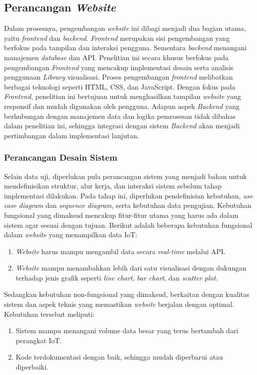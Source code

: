 \subsection{Perancangan \textit{Website}}
Dalam prosesnya, pengembangan \textit{website} ini dibagi menjadi dua bagian utama, yaitu \textit{frontend} dan \textit{backend}. \textit{Frontend} merupakan sisi pengembangan yang berfokus pada tampilan dan interaksi pengguna. Sementara \textit{backend} menangani manajemen \textit{database} dan API. Penelitian ini secara khusus berfokus pada pengembangan \textit{Frontend} yang mencakup implementasi desain serta analisis penggunaan \textit{Library} visualisasi. Proses pengembangan \textit{frontend} melibatkan berbagai teknologi seperti HTML, CSS, dan JavaScript. Dengan fokus pada \textit{Frontend}, penelitian ini bertujuan untuk menghasilkan tampilan \textit{website} yang responsif dan mudah digunakan oleh pengguna. Adapun aspek \textit{Backend} yang berhubungan dengan manajemen data dan logika pemrosesan tidak dibahas dalam penelitian ini, sehingga integrasi dengan sistem \textit{Backend} akan menjadi pertimbangan dalam implementasi lanjutan.

\subsubsection{Perancangan Desain Sistem}
Selain data uji, diperlukan pula perancangan sistem yang menjadi bahan untuk mendefinisikan struktur, alur kerja, dan interaksi sistem sebelum tahap implementasi dilakukan. Pada tahap ini, diperlukan pendefinisian kebutuhan, \textit{use case diagram} dan \textit{sequence diagram}, serta kebutuhan data pengujian. Kebutuhan fungsional yang dimaksud mencakup fitur-fitur utama yang harus ada dalam sistem agar sesuai dengan tujuan. Berikut adalah beberapa kebutuhan fungsional dalam \textit{website} yang menampilkan data IoT:

\begin{enumerate}[label={\arabic*.}]
	\item \textit{Website} harus mampu mengambil data secara \textit{real-time} melalui API.
	\item \textit{Website} mampu menambahkan lebih dari satu visualisasi dengan dukungan terhadap jenis grafik seperti \textit{line chart}, \textit{bar chart}, dan \textit{scatter plot}. 
\end{enumerate}

Sedangkan kebutuhan non-fungsional yang dimaksud, berkaitan dengan kualitas sistem dan aspek teknis yang memastikan \textit{website} berjalan dengan optimal. Kebutuhan tersebut meliputi: 
\begin{enumerate}[label={\arabic*.}]
	\item Sistem mampu menangani volume data besar yang terus bertambah dari perangkat IoT.
	\item Kode terdokumentasi dengan baik, sehingga mudah diperbarui atau diperbaiki.
\end{enumerate}

